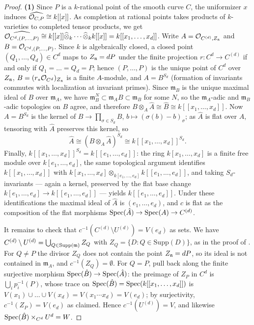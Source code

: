 \begin{proof}
    \textbf{(1)} Since $P$ is a $k$-rational point of the smooth curve $C$, the uniformizer $x$ induces
    $\widehat{\mathcal{O}_{C,P}} \cong k[[x]]$. As completion at rational points takes products of $k$-varieties to completed tensor
    products, we get $\widehat{\mathcal{O}_{C^d, (P, \dots, P)}} \cong k[[x]] \widehat{\otimes}_k \cdots \widehat{\otimes}_k k[[x]] = k[[x_1, \dots, x_d]]$.
    Write $A = \mathcal{O}_{C^{(d)}, Z_{\mathfrak{n}}}$ and $B = \mathcal{O}_{C^d, (P, \dots, P)}$.
    Since $k$ is algebraically closed, a closed point $(Q_1, \dots, Q_d) \in C^d$ maps to $Z_{\mathfrak{n}} = dP$ under the finite
    projection $r: C^d \to C^{(d)}$ if and only if $Q_1 = \dots = Q_d = P$; hence $(P, \dots, P)$ is the unique point of
    $C^d$ over $Z_{\mathfrak{n}}$, $B = (r_* \mathcal{O}_{C^d})_{Z_{\mathfrak{n}}}$ is a finite $A$-module, and $A = B^{S_d}$ (formation of invariants
    commutes with localization at invariant primes).
    Since $\mathfrak{m}_B$ is the unique maximal ideal of $B$ over $\mathfrak{m}_A$, we have
    $\mathfrak{m}_B^N \subset \mathfrak{m}_A B \subset \mathfrak{m}_B$ for some $N$, so the $\mathfrak{m}_A$-adic and
    $\mathfrak{m}_B$-adic topologies on $B$ agree, and therefore $B \otimes_A \hat{A} \cong \hat{B} \cong k[[x_1, \dots, x_d]]$.
    Now $A = B^{S_d}$ is the kernel of $B \to \prod_{\sigma \in S_d} B$, $b \mapsto (\sigma(b) - b)_\sigma$; as $\hat{A}$ is
    flat over $A$, tensoring with $\hat{A}$ preserves this kernel, so
    $$\hat{A} \cong (B \otimes_A \hat{A})^{S_d} \cong k[[x_1, \dots, x_d]]^{S_d}.$$
    Finally, $k[[x_1, \dots, x_d]]^{S_d} = k[[e_1, \dots, e_d]]$: the ring $k[x_1, \dots, x_d]$ is a finite free module over
    $k[e_1, \dots, e_d]$, the same topological argument identifies $k[[x_1, \dots, x_d]]$ with
    $k[x_1, \dots, x_d] \otimes_{k[e_1, \dots, e_d]} k[[e_1, \dots, e_d]]$, and taking $S_d$-invariants --- again a kernel,
    preserved by the flat base change $k[e_1, \dots, e_d] \to k[[e_1, \dots, e_d]]$ --- yields $k[[e_1, \dots, e_d]]$.
    Under these identifications the maximal ideal of $\hat{A}$ is $(e_1, \dots, e_d)$, and $c$ is flat as the composition of
    the flat morphisms $\operatorname{Spec}(\hat{A}) \to \operatorname{Spec}(A) \to C^{(d)}$.

    It remains to check that $c^{-1}(C^{(d)} \setminus U^{(d)}) = V(e_d)$ as sets. We have
    $C^{(d)} \setminus U^{(d)} = \bigcup_{Q \in \mathrm{Supp}(\mathfrak{m})} Z_Q$ with $Z_Q = \{D : Q \in \mathrm{Supp}(D)\}$, as in
    the proof of . For $Q \neq P$ the divisor $Z_Q$ does not contain the point
    $Z_{\mathfrak{n}} = dP$, so its ideal is not contained in $\mathfrak{m}_A$, and $c^{-1}(Z_Q) = \emptyset$. For $Q = P$, pull back
    along the finite surjective morphism $\operatorname{Spec}(\hat{B}) \to \operatorname{Spec}(\hat{A})$: the preimage of $Z_P$ in $C^d$ is
    $\bigcup_i p_i^{-1}(P)$, whose trace on $\operatorname{Spec}(\hat{B}) = \operatorname{Spec}(k[[x_1, \dots, x_d]])$ is
    $V(x_1) \cup \dots \cup V(x_d) = V(x_1 \cdots x_d) = V(e_d)$; by surjectivity, $c^{-1}(Z_P) = V(e_d)$ as claimed. Hence
    $c^{-1}(U^{(d)}) = V$, and likewise $\operatorname{Spec}(\hat{B}) \times_{C^d} U^d = W$.


\end{proof}
